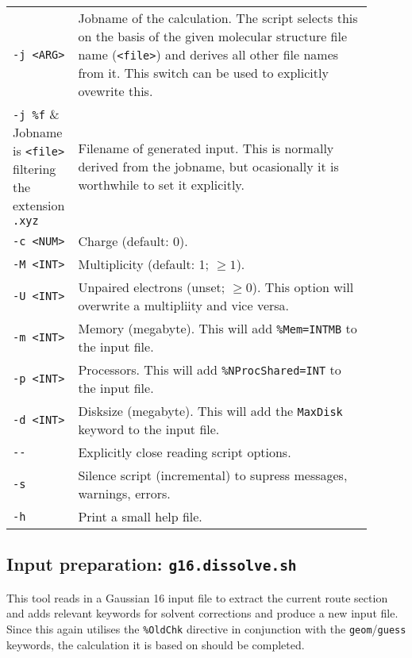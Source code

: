 \documentclass[   %
  final,          %
  a4paper         %
]{article}
\begin{document}
\begin{longtable}{p{0.1\linewidth}p{0.8\linewidth}}
  {\lstinline`-j <ARG>`} & Jobname of the calculation.
    The script selects this on the basis of the given molecular structure file name ({\lstinline`<file>`})
    and derives all other file names from it. This switch can be used to explicitly ovewrite this. \\
  {\lstinline`-j %f`}    & Jobname is {\lstinline`<file>`} filtering the extension \texttt{.xyz} \\
  {\lstinline`-j %s`}    & Jobname is {\lstinline`<file>`} filtering the extension \texttt{start.xyz} \\
  {\lstinline`-f <ARG>`} & Filename of generated input.
    This is normally derived from the jobname, but ocasionally it is worthwhile to set it explicitly. \\
  {\lstinline`-c <NUM>`} & Charge (default: 0). \\
  {\lstinline`-M <INT>`} & Multiplicity (default: 1; \( \geq 1 \)). \\
  {\lstinline`-U <INT>`} & Unpaired electrons (unset; \( \geq 0 \)). 
    This option will overwrite a multipliity and vice versa.\\
  {\lstinline`-m <INT>`} & Memory (megabyte). This will add \texttt{\%Mem={\lstinline`INT`}MB} to the input file. \\
  {\lstinline`-p <INT>`} & Processors. This will add \texttt{\%NProcShared={\lstinline`INT`}} to the input file. \\
  {\lstinline`-d <INT>`} & Disksize (megabyte). This will add the \texttt{MaxDisk} keyword to the input file. \\
  {\lstinline`--`}       & Explicitly close reading script options. \\
  {\lstinline`-s`}       & Silence script (incremental) to supress messages, warnings, errors. \\
  {\lstinline`-h`}       & Print a small help file. \\
\end{longtable}

\subsection{Input preparation: \texorpdfstring{{\lstinline`g16.dissolve.sh`}}{g16.dissolve.sh}}
\label{sec:g16.dissolve}

This tool reads in a Gaussian 16 input file to extract the current route section
and adds relevant keywords for solvent corrections and produce a new input file.
Since this again utilises the \texttt{\%OldChk} directive in conjunction with 
the \texttt{geom}/\texttt{guess} keywords, the calculation it is based on should be completed.
\end{document}
